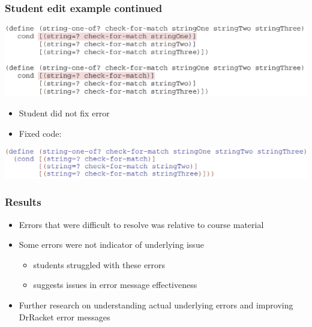 \documentclass{beamer}
\begin{document}
\begin{frame}[fragile]
 \frametitle{Student edit example continued}
       \includegraphics[width=0.9\paperwidth]{RacketStudentEditPt2.pdf}
       		\\
		
		\begin{itemize}
 			\item Student did not fix error
 			\item Fixed code:
		\end{itemize}
		\includegraphics[width=0.9\paperwidth]{fixedCode.png}
\end{frame}

\begin{frame}
	\frametitle{Results}
		\begin{itemize}
			\item Errors that were difficult to resolve was relative to course material
			\item Some errors were not indicator of underlying issue
			\begin{itemize}
				\item students struggled with these errors
				\item suggests issues in error message effectiveness
			\end{itemize}
			\item Further research on understanding actual underlying errors and improving DrRacket error messages
		\end{itemize}
\end{frame}
\end{document}
